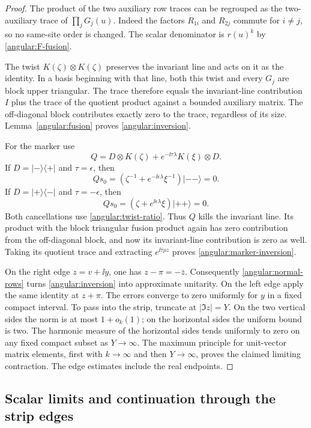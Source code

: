\begin{proof}
The product of the two auxiliary row traces can be regrouped as
the two-auxiliary trace of $\prod_jG_j(u)$.  Indeed the factors
$R_{1i}$ and $R_{2j}$ commute for $i\ne j$, so no same-site order
is changed.  The scalar denominator is $r(u)^k$ by
\eqref{angular:F-fusion}.

The twist $K(\zeta)\otimes K(\zeta)$ preserves the invariant
line and acts on it as the identity.  In a basis beginning with
that line, both this twist and every $G_j$ are block upper
triangular.  The trace therefore equals the invariant-line
contribution $I$ plus the trace of the quotient product against
a bounded auxiliary matrix.  The off-diagonal block contributes
exactly zero to the trace, regardless of its size.
Lemma~\ref{angular:fusion} proves \eqref{angular:inversion}.

For the marker use
\[
 Q=D\otimes K(\zeta)
       +e^{-\ii\tau\lambda}K(\xi)\otimes D.
\]
If $D=|-\rangle\langle+|$ and $\tau=\epsilon$, then
\[
 Qs_0=(\zeta^{-1}+e^{-\ii\epsilon\lambda}\xi^{-1})|--\rangle=0.
\]
If $D=|+\rangle\langle-|$ and $\tau=-\epsilon$, then
\[
 Qs_0=(\zeta+e^{\ii\epsilon\lambda}\xi)|++\rangle=0.
\]
Both cancellations use \eqref{angular:twist-ratio}.  Thus $Q$
kills the invariant line.  Its product with the block triangular
fusion product again has zero contribution from the off-diagonal
block, and now its invariant-line contribution is zero as well.
Taking its quotient trace and extracting $e^{\ii\tau\rho z}$
proves \eqref{angular:marker-inversion}.

On the right edge $z=v+\ii y$, one has $z-\pi=-\bar z$.
Consequently \eqref{angular:normal-rows} turns
\eqref{angular:inversion} into approximate unitarity.  On the left
edge apply the same identity at $z+\pi$.  The errors converge to
zero uniformly for $y$ in a fixed compact interval.  To pass into
the strip, truncate at $|\Im z|=Y$.  On the two vertical sides
the norm is at most $1+o_k(1)$; on the horizontal sides the
uniform bound is two.  The harmonic measure of the horizontal
sides tends uniformly to zero on any fixed compact subset as
$Y\to\infty$.  The maximum principle for unit-vector matrix
elements, first with $k\to\infty$ and then $Y\to\infty$, proves
the claimed limiting contraction.  The edge estimates include
the real endpoints.
\end{proof}

\subsection{Scalar limits and continuation through the strip edges}

